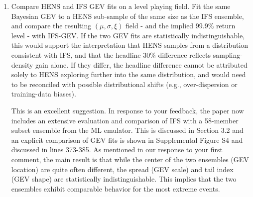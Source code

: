 \documentclass[11pt]{article}
\newcommand{\newTxt}{\textcolor{cadmiumgreen}}
\begin{document}
\begin{enumerate}
\begin{enumerate}

    \newTxt{Thank you for raising this point. We note that the IFS-GEV posterior distributions have already been propagated into the headline aggregate: the posterior distributions on the GEV coefficients imply a posterior distribution of the 99.9 percentile, which is used to calculate the IPCC confidence category at each grid box. 
    Ultimately, it is unclear how to obtain an uncertainty on the 30\% headline since, in a way, this \textit{is} the uncertainty. 
    As an aside, we have elected to not pursue a spatial analysis for this work, since it is unclear what spatial scale for any pooling (latitude-based or otherwise) is appropriate. }
    
    \item Compare HENS and IFS GEV fits on a level playing field. Fit the same Bayesian GEV to a HENS sub-sample of the same size as the IFS ensemble, and compare the resulting $(\mu, \sigma, \xi)$ field - and the implied 99.9\% return level - with IFS-GEV. If the two GEV fits are statistically indistinguishable, this would support the interpretation that HENS samples from a distribution consistent with IFS, and that the headline 30\% difference reflects sampling-density gain alone. If they differ, the headline difference cannot be attributed solely to HENS exploring further into the same distribution, and would need to be reconciled with possible distributional shifts (e.g., over-dispersion or training-data biases).


    \newTxt{This is an excellent suggestion. In response to your feedback, the paper now includes an extensive evaluation and comparison of IFS with a 58-member subset ensemble from the ML emulator. This is discussed in Section 3.2 and an explicit comparison of GEV fits is shown in Supplemental Figure S4 and discussed in lines 373-385. As mentioned in our response to your first comment, the main result is that while the center of the two ensembles (GEV location) are quite often different, the spread (GEV scale) and tail index (GEV shape) are statistically indistinguishable. This implies that the two ensembles exhibit comparable behavior for the most extreme events.}


\end{enumerate}
\end{enumerate}
\end{document}
